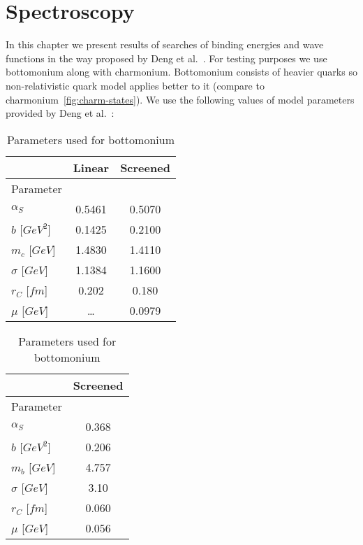 \chapter{Spectroscopy}
In this chapter we present results of searches of binding energies and wave functions in the way proposed by Deng et al.~\cite{deng-bot,deng-charm}. For testing purposes we use bottomonium along with charmonium. Bottomonium consists of heavier quarks so non-relativistic quark model applies better to it (compare to charmonium~\cref{fig:charm-states}). We use the following values of model parameters provided by Deng et al.~\cite{deng-bot,deng-charm}:

\begin{table}[H] \begin{floatrow}
\ttabbox
    {\caption{Parameters used for charmonium}}
    {\begin{tabular}{l|c|c}
        {} & Linear & Screened \\ \hline
        Parameter & {} & {} \\ \cline{1-1}
        $\alpha_S$ & 0.5461 & 0.5070 \\
        $b$ [$GeV^2$] & 0.1425 & 0.2100 \\
        $m_c$ [$GeV$] & 1.4830 & 1.4110 \\
        $\sigma$ [$GeV$] & 1.1384 & 1.1600 \\
        $r_C$ [$fm$] & 0.202 & 0.180 \\
        $\mu$ [$GeV$] & \ldots & 0.0979 \\ \hline
    \end{tabular}}
\hspace{2cm}
\ttabbox
    {\caption{Parameters used for bottomonium}}
    {\begin{tabular}{l|c}
        {} & Screened \\ \hline
        Parameter & {} \\ \cline{1-1}
        $\alpha_S$ & 0.368 \\
        $b$ [$GeV^2$] & 0.206 \\
        $m_b$ [$GeV$] & 4.757 \\
        $\sigma$ [$GeV$] & 3.10 \\
        $r_C$ [$fm$] & 0.060 \\
        $\mu$ [$GeV$] & 0.056 \\ \hline
    \end{tabular}}
\end{floatrow}
\end{table}

